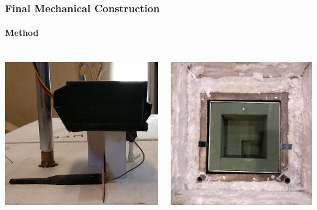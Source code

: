 \documentclass %
[																	%
	aspectratio=1610,                                               %
	11pt,															%
	hyperref={pdfpagelabels=false},									%
	xcolor	= pdftex, dvipsnames, table,							%
]																	%
{beamer}															%
\begin{document}
\begin{frame}
	\frametitle{Final Mechanical Construction}
	\framesubtitle{Method}
	
	\begin{columns}[c] %
		\begin{column}{0.5\textwidth}
			\begin{center}
			    \includegraphics[height = 6.5cm]{Images/mechanical_construction_cropped.png}
			\end{center}
		\end{column}
		\begin{column}{0.5\textwidth}
			\begin{center}
			    \includegraphics[height = 6.5cm]{Images/water_box.png}
			\end{center}
		\end{column}	
    \end{columns}
    
\end{frame}
\end{document}
